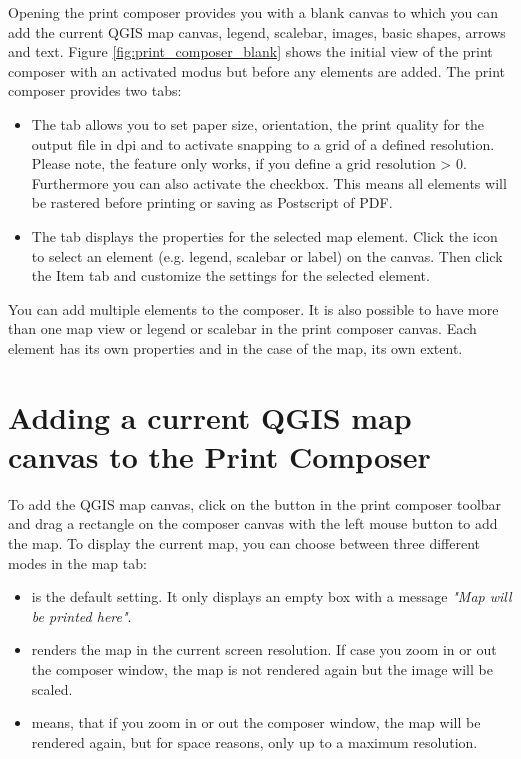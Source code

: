 Opening the print composer provides you with a blank canvas to which you can 
add the current QGIS map canvas, legend, scalebar, images, basic shapes,
arrows and text. Figure \ref{fig:print_composer_blank} shows the initial view
of the print composer with an activated  modus but
before any elements are added. The print composer provides two tabs:

\begin{itemize}[label=--]
\item The  tab allows you to set paper size, orientation, the
print quality for the output file in dpi and to activate snapping to a grid
of a defined resolution. Please note, the  feature
only works, if you define a grid resolution > 0. Furthermore you can also
activate the  checkbox. This means all elements
will be rastered before printing or saving as Postscript of PDF.
\item The  tab displays the properties for the selected map element. 
Click the  
icon to select an element (e.g. legend, scalebar or label) on the canvas. 
Then click the Item tab and customize the settings for the selected 
element.
\end{itemize}

You can add multiple elements to the composer. It is also possible to have 
more than one map view or legend or scalebar in the print composer canvas. 
Each element has its own properties and in the case of the map, its own 
extent.

\section{Adding a current QGIS map canvas to the Print Composer}

To add the QGIS map canvas, click on the  button in the print composer toolbar and drag a 
rectangle on the composer canvas with the left mouse button to add the map. 
To display the current map, you can choose between three different modes in
the map  tab:

\begin{itemize}[label=--]
\item {} is the default setting. It only
displays an empty box with a message \textit{"Map will be printed here"}. 
\item {} renders the map in the current screen
resolution. If case you zoom in or out the composer window, the map is not
rendered again but the image will be scaled.
\item {} means, that if you zoom in or out the
composer window, the map will be rendered again, but for space reasons, only
up to a maximum resolution.
\end{itemize}

